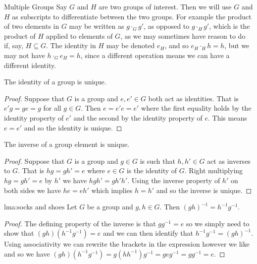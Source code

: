 \documentclass[fleqn]{NotesClass}
\begin{document}
    \begin{ntn}{Multiple Groups}{}
        Say \(G\) and \(H\) are two groups of interest.
        Then we will use \(G\) and \(H\) as subscripts to differentiate between the two groups.
        For example the product of two elements in \(G\) may be written as \(g \cdot_G g'\), as opposed to \(g \cdot_H g'\), which is the product of \(H\) applied to elements of \(G\), as we may sometimes have reason to do if, say, \(H \subseteq G\).
        The identity in \(H\) may be denoted \(e_H\), and so \(e_H \cdot_H h = h\), but we may not have \(h \cdot_G e_H = h\), since a different operation means we can have a different identity.
    \end{ntn}
    
    \begin{lma}{}{}
        The identity of a group is unique.
        
        \begin{proof}
            Suppose that \(G\) is a group and \(e, e' \in G\) both act as identities.
            That is \(e'g = ge = g\) for all \(g \in G\).
            Then \(e = e'e = e'\) where the first equality holds by the identity property of \(e'\) and the second by the identity property of \(e\).
            This means \(e = e'\) and so the identity is unique.
        \end{proof}
    \end{lma}
    
    \begin{lma}{}{}
        The inverse of a group element is unique.
        
        \begin{proof}
            Suppose that \(G\) is a group and \(g \in G\) is such that \(h, h' \in G\) act as inverses to \(G\).
            That is \(hg = gh' = e\) where \(e \in G\) is the identity of \(G\).
            Right multiplying \(hg = gh' = e\) by \(h'\) we have \(hgh' = gh'h'\).
            Using the inverse property of \(h'\) on both sides we have \(he = eh'\) which implies \(h = h'\) and so the inverse is unique.
        \end{proof}
    \end{lma}
    
    \begin{lma}{}{lma:socks and shoes}
        Let \(G\) be a group and \(g, h \in G\).
        Then \((gh)^{-1} = h^{-1}g^{-1}\).
        \begin{proof}
            The defining property of the inverse is that \(gg^{-1} = e\) so we simply need to show that \((gh)(h^{-1}g^{-1}) = e\) and we can then identify that \(h^{-1}g^{-1} = (gh)^{-1}\).
            Using associativity we can rewrite the brackets in the expression however we like and so we have \((gh)(h^{-1}g^{-1}) = g(hh^{-1})g^{-1} = geg^{-1} = gg^{-1} = e\).
        \end{proof}
    \end{lma}
    
\end{document}
